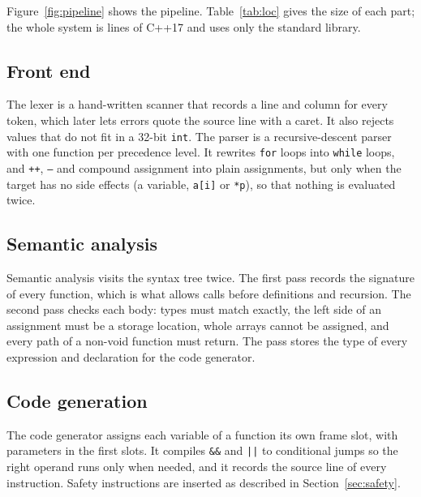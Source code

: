 \documentclass[conference]{IEEEtran}
\begin{document}
Figure~\ref{fig:pipeline} shows the pipeline. Table~\ref{tab:loc} gives the size of each part; the whole system is
 lines of C++17 and uses only the standard library.

\begin{table}[t]
\caption{Source size by component (lines of code).}
\label{tab:loc}
\centering

\end{table}

\subsection{Front end}
The lexer is a hand-written scanner that records a line and column for every token, which later lets errors quote
the source line with a caret. It also rejects values that do not fit in a 32-bit \texttt{int}. The parser is a
recursive-descent parser with one function per precedence level. It rewrites \texttt{for} loops into
\texttt{while} loops, and \texttt{++}, \texttt{--} and compound assignment into plain assignments, but only when
the target has no side effects (a variable, \texttt{a[i]} or \texttt{*p}), so that nothing is evaluated twice.

\subsection{Semantic analysis}
Semantic analysis visits the syntax tree twice. The first pass records the signature of every function, which is
what allows calls before definitions and recursion. The second pass checks each body: types must match exactly,
the left side of an assignment must be a storage location, whole arrays cannot be assigned, and every path of a
non-void function must return. The pass stores the type of every expression and declaration for the code
generator.

\subsection{Code generation}
The code generator assigns each variable of a function its own frame slot, with parameters in the first slots.
It compiles \texttt{\&\&} and \texttt{||} to conditional jumps so the right operand runs only when needed, and it
records the source line of every instruction. Safety instructions are inserted as described in
Section~\ref{sec:safety}.
\end{document}
